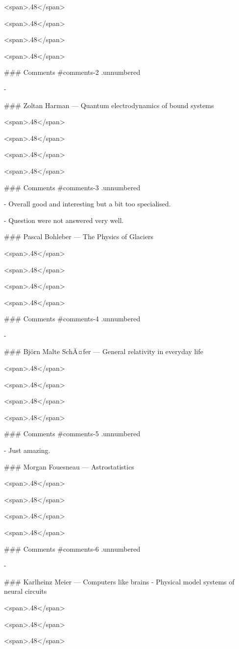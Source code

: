 <span>.48</span>

<span>.48</span>

<span>.48</span>

<span>.48</span>

### Comments {#comments-2 .unnumbered}

-

### Zoltan Harman — Quantum electrodynamics of bound systems

<span>.48</span>

<span>.48</span>

<span>.48</span>

<span>.48</span>

### Comments {#comments-3 .unnumbered}

-   Overall good and interesting but a bit too specialised.

-   Question were not answered very well.

### Pascal Bohleber — The Physics of Glaciers 

<span>.48</span>

<span>.48</span>

<span>.48</span>

<span>.48</span>

### Comments {#comments-4 .unnumbered}

-

### Björn Malte SchĂ¤fer — General relativity in everyday life

<span>.48</span>

<span>.48</span>

<span>.48</span>

<span>.48</span>

### Comments {#comments-5 .unnumbered}

-   Just amazing.

### Morgan Fouesneau — Astrostatistics 

<span>.48</span>

<span>.48</span>

<span>.48</span>

<span>.48</span>

### Comments {#comments-6 .unnumbered}

-

### Karlheinz Meier — Computers like brains - Physical model systems of neural circuits

<span>.48</span>

<span>.48</span>

<span>.48</span>

